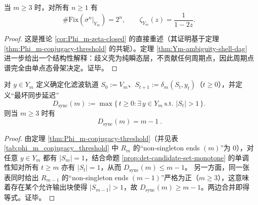 \begin{corollary}\label{cor:Ym-periodic-rigidity}
当 $m\ge 3$ 时，对所有 $n\ge 1$ 有
\[
\#\mathrm{Fix}(\sigma^n|_{Y_m})=2^n,
\qquad
\zeta_{Y_m}(z)=\frac{1}{1-2z}.
\]
\end{corollary}
\begin{proof}
这是推论 \ref{cor:Phi_m-zeta-closed} 的直接重述（其证明基于定理 \ref{thm:Phi_m-conjugacy-threshold} 的共轭）。定理 \ref{thm:Ym-ambiguity-shell-dag} 进一步给出一个结构性解释：歧义壳为纯瞬态层，不贡献任何周期点，因此周期点谱完全由单点态骨架决定。证毕。
\end{proof}

\begin{corollary}[同步延迟的闭式与尖锐性]\label{cor:Ym-sync-delay}
对 $y\in Y_m$ 定义确定化滤波轨道 $S_0:=V_m$、$S_{t+1}:=\delta_m(S_t,y_t)$（$t\ge 0$），并定义“最坏同步延迟”
\[
D_{\mathrm{sync}}(m):=\max\{\,t\ge 0:\exists\,y\in Y_m\ \text{s.t. }|S_t|>1\,\}.
\]
则当 $m\ge 3$ 时有
\[
\boxed{\ D_{\mathrm{sync}}(m)=m-1\ }.
\]
\end{corollary}
\begin{proof}
由定理 \ref{thm:Phi_m-conjugacy-threshold}（并见表 \ref{tab:phi_m_conjugacy_threshold} 中 $R_m$ 的“non-singleton ends $(m)$”为 $0$），对任意 $y\in Y_m$ 都有 $|S_m|=1$，结合命题 \ref{prop:det-candidate-set-monotone} 的单调性知对所有 $t\ge m$ 亦有 $|S_t|=1$，从而 $D_{\mathrm{sync}}(m)\le m-1$。
另一方面，同一张表同时给出 $R_{m-1}$ 的“non-singleton ends $(m-1)$”严格为正（$m\ge 3$），这意味着存在某个允许输出块使得 $|S_{m-1}|>1$，故 $D_{\mathrm{sync}}(m)\ge m-1$。两边合并即得等式。证毕。
\end{proof}

